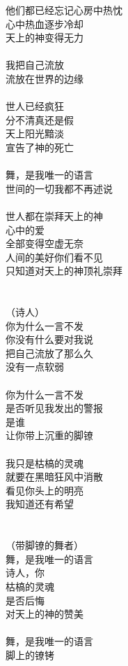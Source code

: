 他们都已经忘记心房中热忱\\
心中热血逐步冷却\\
天上的神变得无力\\
\\
我把自己流放\\
流放在世界的边缘\\
\\
世人已经疯狂\\
分不清真还是假\\
天上阳光黯淡\\
宣告了神的死亡\\
\\
舞，是我唯一的语言\\
世间的一切我都不再述说\\
\\
世人都在崇拜天上的神\\
心中的爱\\
全部变得空虚无奈\\
人间的美好你们看不见\\
只知道对天上的神顶礼崇拜\\
\\
\\
（诗人）\\
你为什么一言不发\\
你没有什么要对我说\\
把自己流放了那么久\\
没有一点软弱\\
\\
你为什么一言不发\\
是否听见我发出的警报\\
是谁\\
让你带上沉重的脚镣\\
\\
我只是枯槁的灵魂\\
就要在黑暗狂风中消散\\
看见你头上的明亮\\
我知道还有希望\\
\\
\\
（带脚镣的舞者）\\
舞，是我唯一的语言\\
诗人，你\\
枯槁的灵魂\\
是否后悔\\
对天上的神的赞美\\
\\
舞，是我唯一的语言\\
脚上的镣铐\\
